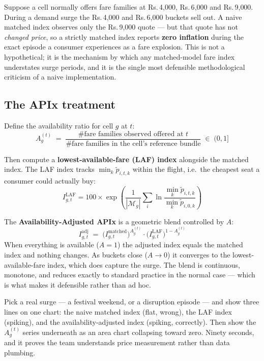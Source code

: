 Suppose a cell normally offers fare families at Rs.\,4{,}000, Rs.\,6{,}000 and
Rs.\,9{,}000. During a demand surge the Rs.\,4{,}000 and Rs.\,6{,}000 buckets
sell out. A naive matched index observes only the Rs.\,9{,}000 quote --- but that quote
has not \emph{changed price}, so a strictly matched index reports \textbf{zero inflation}
during the exact episode a consumer experiences as a fare explosion. This is not a hypothetical;
it is the mechanism by which any matched-model fare index understates surge periods, and it
is the single most defensible methodological criticism of a naive implementation.

\subsection{The APIx treatment}

Define the availability ratio for cell $g$ at $t$:
\begin{equation}
A_g^{(t)} \;=\; \frac{\text{\# fare families observed offered at } t}{\text{\# fare families in the cell's reference bundle}}
\;\in\;(0,1]
\end{equation}

Then compute a \textbf{lowest-available-fare (LAF) index} alongside the matched index. The
LAF index tracks $\min_k \tilde p_{i,t,k}$ within the flight, i.e.\ the cheapest seat a
consumer could actually buy:
\begin{equation}
I^{\text{LAF}}_{g,t} = 100\times\exp\!\left(\frac{1}{|\mathcal{M}_g|}\sum_{i}
\ln\frac{\min_k \tilde p_{i,t,k}}{\min_k \tilde p_{i,0,k}}\right)
\end{equation}

The \textbf{Availability-Adjusted APIx} is a geometric blend controlled by $A$:
\begin{equation}
\boxed{\;
I^{\text{adj}}_{g,t} \;=\; \big(I^{\text{matched}}_{g,t}\big)^{A_g^{(t)}}\cdot
\big(I^{\text{LAF}}_{g,t}\big)^{1-A_g^{(t)}}\;}
\end{equation}
When everything is available ($A=1$) the adjusted index equals the matched index and nothing
changes. As buckets close ($A\to 0$) it converges to the lowest-available-fare index, which
does capture the surge. The blend is continuous, monotone, and reduces exactly to standard
practice in the normal case --- which is what makes it defensible rather than ad hoc.

\begin{keybox}
 Pick a real surge --- a festival
weekend, or a disruption episode --- and show three lines on one chart: the naive matched
index (flat, wrong), the LAF index (spiking), and the availability-adjusted index
(spiking, correctly). Then show the $A_g^{(t)}$ series underneath as an area chart
collapsing toward zero. Ninety seconds, and it proves the team understands price
measurement rather than data plumbing.
\end{keybox}

